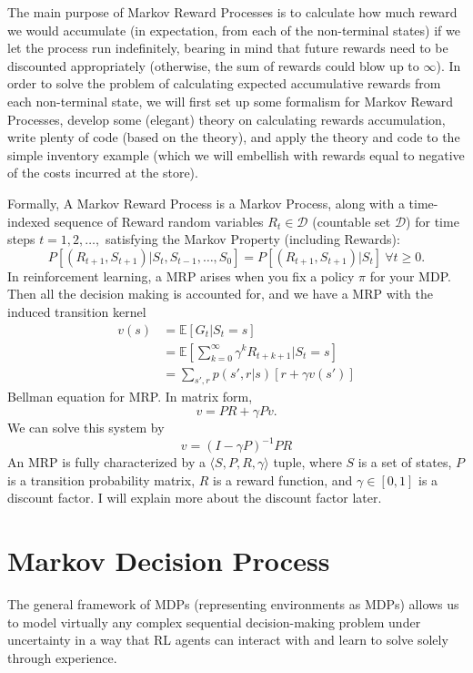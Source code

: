 The main purpose of Markov Reward Processes is to calculate how much reward we would accumulate (in expectation, from each of the non-terminal states) if we let the process run indefinitely, bearing in mind that future rewards need to be discounted appropriately (otherwise, the sum of rewards could blow up to $\infty$). In order to solve the problem of calculating expected accumulative rewards from each non-terminal state, we will first set up some formalism for Markov Reward Processes, develop some (elegant) theory on calculating rewards accumulation, write plenty of code (based on the theory), and apply the theory and code to the simple inventory example (which we will embellish with rewards equal to negative of the costs incurred at the store).

Formally, A Markov Reward Process is a Markov Process, along with a time-indexed sequence of Reward random variables $R_t\in \mathcal{D}$ (countable set $\mathcal{D}$) for time steps $t=1,2,\dots,$ satisfying the Markov Property (including Rewards):
$$P[(R_{t+1}, S_{t+1})|S_t, S_{t-1}, \dots , S_0] = P[(R_{t+1}, S_{t+1})|S_t]\  \forall t\geq 0.$$
In reinforcement learning, a MRP arises when you fix a policy $\pi$ for your MDP. Then all the decision making is accounted for, and we have a MRP with the induced transition kernel
\begin{align*}
	v(s)&=\mathbb{E}[G_t|S_t=s]\\
		&=\mathbb{E}\left[\sum_{k=0}^\infty \gamma^kR_{t+k+1}|S_t=s\right]\\
		&= \sum_{s',r}p(s',r|s)[r+\gamma v(s')]
\end{align*} 
Bellman equation for MRP. In matrix form,
$$v = PR+\gamma Pv.$$
We can solve this system by
$$v = (I-\gamma P)^{-1}PR$$
An MRP is fully characterized by a $\langle S,P,R,\gamma \rangle$ tuple, where $S$ is a set of states, $P$ is a transition probability matrix, $R$ is a reward function, and $\gamma\in[0,1]$  is a discount factor. I will explain more about the discount factor later. 


\section{Markov Decision Process}

The general framework of MDPs (representing environments as MDPs) allows us to model virtually any complex sequential decision-making problem under uncertainty in a way that RL agents can interact with and learn to solve solely through experience. 

